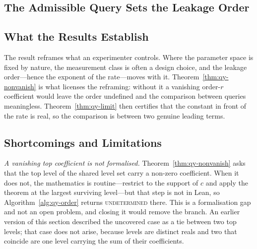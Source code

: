\subsection{The Admissible Query Sets the Leakage Order}
\label{sec:qy-discussion}

\subsection{What the Results Establish}

The result reframes what an experimenter controls. Where the parameter space is fixed by
nature, the measurement class is often a design choice, and the leakage order---hence the
exponent of the rate---moves with it. Theorem~\ref{thm:qy-nonvanish} is what licenses the
reframing: without it a vanishing order-$r$ coefficient would leave the order undefined and
the comparison between queries meaningless. Theorem~\ref{thm:qy-limit} then certifies that the
constant in front of the rate is real, so the comparison is between two genuine leading
terms.

\subsection{Shortcomings and Limitations}
\label{sec:qy-limits}

\emph{A vanishing top coefficient is not formalised.} Theorem~\ref{thm:qy-nonvanish} asks that
the top level of the shared level set carry a non-zero coefficient. When it does not, the
mathematics is routine---restrict to the support of $c$ and apply the theorem at the largest
surviving level---but that step is not in Lean, so Algorithm~\ref{alg:qy-order} returns
\textsc{undetermined} there. This is a formalisation gap and not an open problem, and closing
it would remove the branch. An earlier version of this section described the uncovered case as
a tie between two top levels; that case does not arise, because levels are distinct reals and
two that coincide are one level carrying the sum of their coefficients.

